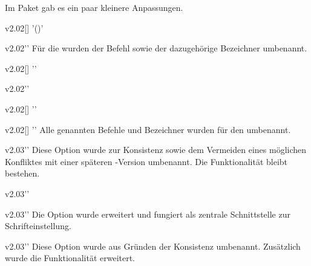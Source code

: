 %
Im Paket  gab es ein paar kleinere Anpassungen.
\begin{Entity}{}
\begin{Obsolete}{v2.02}{[]}%
  '()'
\begin{Obsolete}{v2.02}{}''
\printdeclarationlist%
%
Für die \taskname{} wurden der Befehl sowie der dazugehörige Bezeichner 
umbenannt.
\end{Obsolete}
\end{Obsolete}

\begin{Obsolete}{v2.02}{[]}%
  ''
\begin{Obsolete}{v2.02}{}''
\begin{Obsolete}{v2.02}{[]}%
  ''
\begin{Obsolete}{v2.02}{[]}%
  ''
\printdeclarationlist%
%
Alle genannten Befehle und Bezeichner wurden für den \noticename{} umbenannt.
\end{Obsolete}
\end{Obsolete}
\end{Obsolete}
\end{Obsolete}
\end{Entity}


%
\begin{Obsolete}{v2.03}{}''
\printdeclarationlist%
%
Diese Option wurde zur Konsistenz sowie dem Vermeiden eines möglichen 
Konfliktes mit einer späteren \KOMAScript-Version umbenannt. Die Funktionalität 
bleibt bestehen.
\end{Obsolete}

\begin{Obsolete}{v2.03}{}''
\begin{Obsolete}{v2.03}{}''
\printdeclarationlist%
%
Die Option  wurde erweitert und fungiert als zentrale 
Schnittstelle zur Schrifteinstellung. 
\end{Obsolete}
\end{Obsolete}

\begin{Obsolete}{v2.03}{}''
\printdeclarationlist%
%
Diese Option wurde aus Gründen der Konsistenz umbenannt. Zusätzlich wurde die 
Funktionalität erweitert.
\end{Obsolete}

